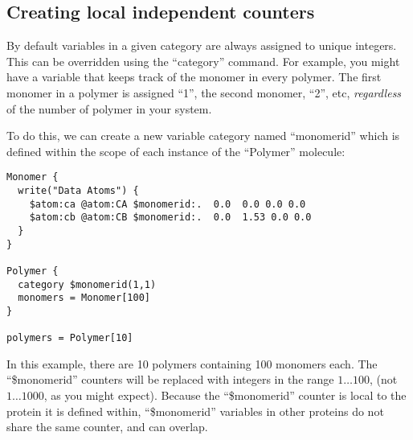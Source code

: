 \documentclass[11pt]{article}
\begin{document}

\subsection{Creating local independent counters}
\label{sec:cpath_simple}
By default variables in a given category are always assigned
to unique integers.
This can be overridden using the ``category'' command.
For example, you might have a variable that keeps track of
the monomer in every polymer.
The first monomer in a polymer is assigned ``1'',
the second monomer, ``2'', etc, 
\textit{regardless} of the number of polymer in your system.

To do this, we can create a new variable category named ``monomerid'' which 
is defined within the scope of each instance of the ``Polymer'' molecule:
\begin{verbatim}
Monomer {
  write("Data Atoms") {
    $atom:ca @atom:CA $monomerid:.  0.0  0.0 0.0 0.0
    $atom:cb @atom:CB $monomerid:.  0.0  1.53 0.0 0.0
  }
}

Polymer {
  category $monomerid(1,1)
  monomers = Monomer[100]
}

polymers = Polymer[10]
\end{verbatim}
In this example, there are 10 polymers containing 100 monomers each.
The ``\$monomerid'' counters will be replaced with integers in the range
$1\ldots 100$,
(not $1\ldots 1000$, as you might expect).
Because the ``\$monomerid'' counter is local to the 
protein it is defined within,
``\$monomerid'' variables in other proteins do not share the same counter,
and can overlap.
\end{document}
